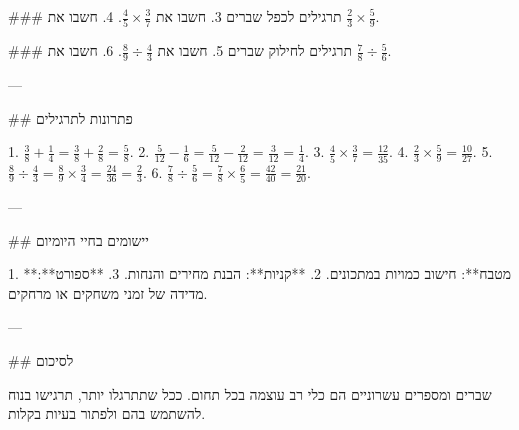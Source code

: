 ### תרגילים לכפל שברים
3. חשבו את $\frac{4}{5} \times \frac{3}{7}$.
4. חשבו את $\frac{2}{3} \times \frac{5}{9}$.

### תרגילים לחילוק שברים
5. חשבו את $\frac{8}{9} \div \frac{4}{3}$.
6. חשבו את $\frac{7}{8} \div \frac{5}{6}$.

---

## פתרונות לתרגילים

1. $\frac{3}{8} + \frac{1}{4} = \frac{3}{8} + \frac{2}{8} = \frac{5}{8}$.
2. $\frac{5}{12} - \frac{1}{6} = \frac{5}{12} - \frac{2}{12} = \frac{3}{12} = \frac{1}{4}$.
3. $\frac{4}{5} \times \frac{3}{7} = \frac{12}{35}$.
4. $\frac{2}{3} \times \frac{5}{9} = \frac{10}{27}$.
5. $\frac{8}{9} \div \frac{4}{3} = \frac{8}{9} \times \frac{3}{4} = \frac{24}{36} = \frac{2}{3}$.
6. $\frac{7}{8} \div \frac{5}{6} = \frac{7}{8} \times \frac{6}{5} = \frac{42}{40} = \frac{21}{20}$.

---

## יישומים בחיי היומיום

1. **מטבח**: חישוב כמויות במתכונים.
2. **קניות**: הבנת מחירים והנחות.
3. **ספורט**: מדידה של זמני משחקים או מרחקים.

---

## לסיכום

שברים ומספרים עשרוניים הם כלי רב עוצמה בכל תחום. ככל שתתרגלו יותר, תרגישו בנוח להשתמש בהם ולפתור בעיות בקלות.
